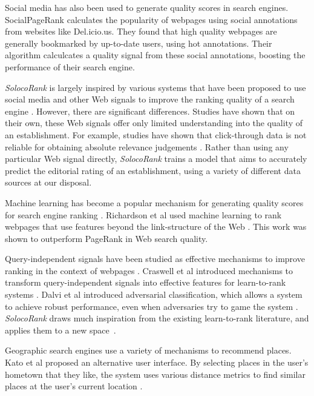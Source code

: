 Social media has also been used to generate quality scores in search engines.
SocialPageRank \cite{bao2007} calculates the popularity of webpages using
social annotations from websites like Del.icio.us.
They found that high quality webpages are generally bookmarked by
up-to-date users, using hot annotations.
Their algorithm calculcates a quality signal from these social annotations,
boosting the performance of their search engine.

\emph{SolocoRank} is largely inspired by various systems that have been proposed to use
social media and other Web signals to improve the ranking quality of a search engine \cite{ganu2009,bao2007,xiang2010}.
However, there are significant differences.
Studies have shown that on their own, these Web signals offer only limited understanding into
the quality of an establishment.
For example, studies have shown that click-through data is not reliable for obtaining
absolute relevance judgements \cite{jain:imagereranking}.
Rather than using any particular Web signal directly, \emph{SolocoRank} trains a model that aims to
accurately predict the editorial rating of an establishment, using a variety of different
data sources at our disposal.

Machine learning has become a popular mechanism for generating
quality scores for search engine ranking \cite{boyan,burges2005}.
Richardson et al used machine learning to rank
webpages that use features beyond the link-structure
of the Web \cite{richardson2006,amento2000}.
This work was shown to outperform PageRank \cite{pagerank} in 
Web search quality.

Query-independent signals have been studied as effective mechanisms to 
improve ranking in the context of webpages \cite{upstill2003}.
Craswell et al introduced mechanisms to transform query-independent
signals into effective features for learn-to-rank systems \cite{craswell2005}.
Dalvi et al introduced adversarial classification, which allows
a system to achieve robust performance, even when adversaries try to game
the system \cite{dalvi2004}.
\emph{SolocoRank} draws much inspiration from the existing learn-to-rank literature,
and applies them to a new space~\cite{boyan,burges2005,richardson2006,amento2000,craswell2005,upstill2003,cao2007learning,radlinski2005query,liu2007letor,xia2008listwise,duan2010empirical,agarwal2006learning,kulis2006learning}.

Geographic search engines use a variety of mechanisms to recommend places.
Kato et al proposed an alternative user interface.
By selecting places in the user's hometown that they like,
the system uses various distance metrics to find similar places at the
user's current location \cite{kato:geosearch}.


